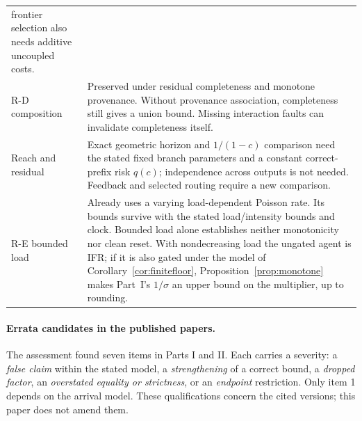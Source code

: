 \documentclass[11pt]{article}
\theoremstyle{definition}
\theoremstyle{remark}
\begin{document}
\begin{longtable}{p{}p{}}
frontier selection also needs additive uncoupled costs.\\
R-D composition & Preserved under residual completeness and monotone provenance.
Without provenance association, completeness still gives a union bound. Missing interaction
faults can invalidate completeness itself.\\
Reach and residual & Exact geometric horizon and $1/(1-c)$ comparison need the stated fixed
branch parameters and a constant correct-prefix risk $q(c)$; independence across outputs is not
needed. Feedback and selected routing require a new comparison.\\
R-E bounded load & Already uses a varying load-dependent Poisson rate. Its bounds survive
with the stated load/intensity bounds and clock. Bounded load alone establishes neither
monotonicity nor clean reset. With nondecreasing load the ungated agent is IFR; if it is also
gated under the model of Corollary~\ref{cor:finitefloor}, Proposition~\ref{prop:monotone} makes
Part~I's $1/\sigma$ an upper bound on the multiplier, up to rounding.\\
\bottomrule
\end{longtable}
\normalsize

\paragraph{Errata candidates in the published papers.}
The assessment found seven items in Parts I and II. Each carries a severity: a \emph{false claim}
within the stated model, a \emph{strengthening} of a correct bound, a \emph{dropped factor}, an
\emph{overstated equality or strictness}, or an \emph{endpoint} restriction. Only item 1 depends on
the arrival model. These qualifications concern the cited versions; this paper does not amend them.
\end{document}
